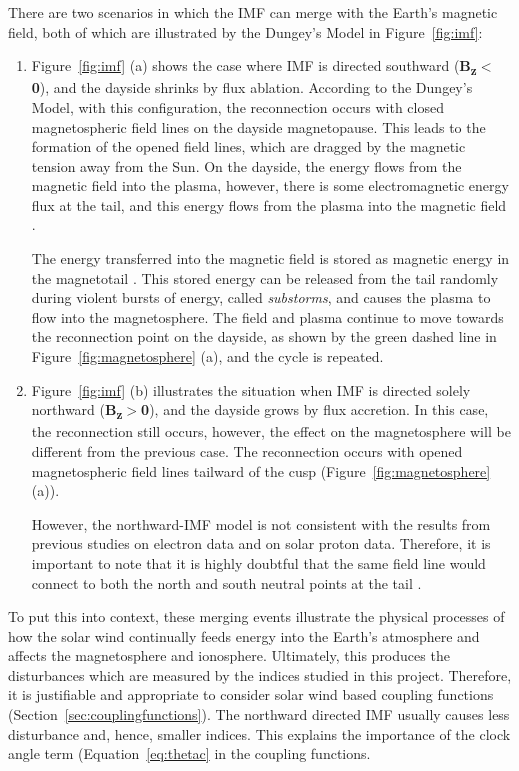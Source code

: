 \documentclass[12pt]{report} %
\begin{document}
\noindent There are two scenarios in which the IMF can merge with the Earth's magnetic field, both of which are illustrated by the Dungey's Model in Figure~\ref{fig:imf}:
\vspace{10pt}

\begin{enumerate}
 \item Figure~\ref{fig:imf} (a) shows the case where IMF is directed southward ({\bfseries B\textsubscript{z}$<$0}), and the dayside shrinks by flux ablation. According to the Dungey's Model, with this configuration, the reconnection occurs with closed magnetospheric field lines on the dayside magnetopause. This leads to the formation of the opened field lines, which are dragged by the magnetic tension away from the Sun. On the dayside, the energy flows from the magnetic field into the plasma, however, there is some electromagnetic energy flux at the tail, and this energy flows from the plasma into the magnetic field \citep{russell00}. 
 
 The energy transferred into the magnetic field is stored as magnetic energy in the magnetotail \citep{men11}. This stored energy can be released from the tail randomly during violent bursts of energy, called \emph{substorms}, and causes the plasma to flow into the magnetosphere. The field and plasma continue to move towards the reconnection point on the dayside, as shown by the green dashed line in Figure~\ref{fig:magnetosphere} (a), and the cycle is repeated.
  
 \item  Figure~\ref{fig:imf} (b) illustrates the situation when IMF is directed solely northward ({\bfseries B\textsubscript{z}$>$0}), and the dayside grows by flux accretion. In this case, the reconnection still occurs, however, the effect on the magnetosphere will be different from the previous case. The reconnection occurs with opened magnetospheric field lines tailward of the cusp (Figure~\ref{fig:magnetosphere} (a)). 
 
 However, the northward-IMF model is not consistent with the results from previous studies on electron data and on solar proton data. Therefore, it is important to note that it is highly doubtful that the same field line would connect to both the north and south neutral points at the tail \citep{russell72}.

\end{enumerate}
\vspace{15pt}

 To put this into context, these merging events illustrate the physical processes of how the solar wind continually feeds energy into the Earth's atmosphere \citep{russell00} and affects the magnetosphere and ionosphere. Ultimately, this produces the disturbances which are measured by the indices studied in this project. Therefore, it is justifiable and appropriate to consider solar wind based coupling functions (Section~\ref{sec:couplingfunctions}). The northward directed IMF usually causes less disturbance and, hence, smaller indices. This explains the importance of the clock angle term (Equation~\ref{eq:thetac} in the coupling functions.
	
\end{document}
